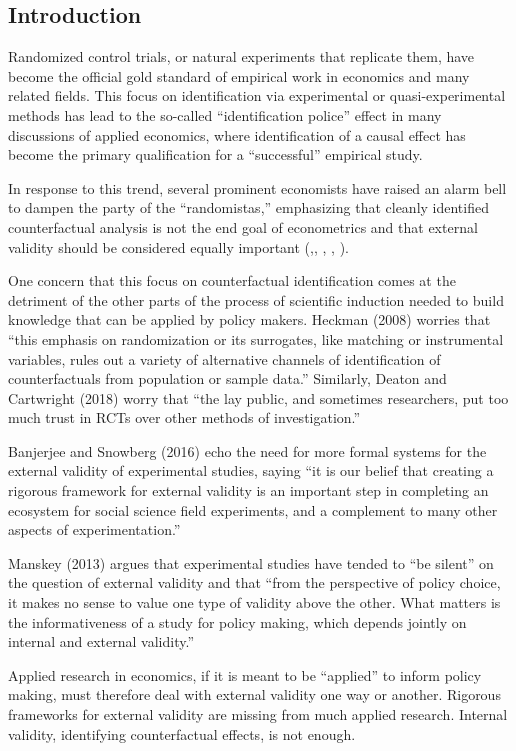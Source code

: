 \documentclass[a4paper,12pt]{article}
\begin{document}
\subsection*{Introduction}

Randomized control trials, or natural experiments that replicate them, have become the official gold standard of empirical work in economics and many related fields. This focus on identification via experimental or quasi-experimental methods has lead to the so-called ``identification police'' effect in many discussions of applied economics, where identification of a causal effect has become the primary qualification for a ``successful'' empirical study.

In response to this trend, several prominent economists have raised an alarm bell to dampen the party of the ``randomistas,'' emphasizing that cleanly identified counterfactual analysis is not the end goal of econometrics and that external validity should be considered equally important (\cite{Shadish2002},\cite{Heckman2008}, \cite{Deaton2010}, \cite{Manski2013}, \cite{Deaton2018}). 

One concern that this focus on counterfactual identification comes at the detriment of the other parts of the process of scientific induction needed to build knowledge that can be applied by policy makers. Heckman (2008) worries that ``this emphasis on randomization or its surrogates, like matching or instrumental variables, rules out a variety of alternative channels of identification of counterfactuals from population or sample data.'' Similarly, Deaton and Cartwright (2018) worry that ``the lay public, and sometimes researchers, put too much trust in RCTs over other methods of investigation.'' 

Banjerjee and Snowberg (2016) echo the need for more formal systems for the external validity of experimental studies, saying ``it is our belief that creating a rigorous framework for external validity is an important step in completing an ecosystem for social science field experiments, and a complement to many other aspects of experimentation.''

Manskey (2013) argues that experimental studies have tended to ``be silent'' on the question of external validity and that ``from the perspective of policy choice, it makes no sense to value one type of validity above the other. What matters is the informativeness of a study for policy making, which depends jointly on internal and external validity.''

Applied research in economics, if it is meant to be ``applied'' to inform policy making, must therefore deal with external validity one way or another. Rigorous frameworks for external validity are missing from much applied research. Internal validity, identifying counterfactual effects, is not enough. 
\end{document}
